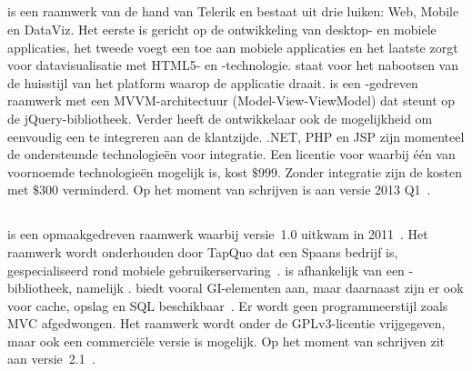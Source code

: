 \subsection{\kendo} %
\kendo{} is een raamwerk van de hand van Telerik en bestaat uit drie luiken:  Web, Mobile en DataViz.
Het eerste is gericht op de ontwikkeling van desktop- en mobiele applicaties,  het tweede voegt een  toe aan mobiele applicaties en het laatste zorgt voor datavisualisatie met HTML5- en \js{}-technologie.
 staat voor het nabootsen van de huisstijl van het platform waarop de applicatie draait.
\kendo{} is een \js{}-gedreven raamwerk met een MVVM-architectuur (Model-View-ViewModel) dat steunt op de jQuery-bibliotheek.
Verder heeft de ontwikkelaar ook de mogelijkheid om eenvoudig een  te integreren aan de klantzijde.
.NET,  PHP en JSP zijn momenteel de ondersteunde technologieën voor  integratie.
Een licentie voor \kendo{} waarbij één van voornoemde technologieën mogelijk is, kost $\$999$.
Zonder  integratie zijn de kosten met $\$300$ verminderd.
Op het moment van schrijven is \kendo{} aan versie 2013 Q1~\cite{Telerik}.

\subsection{\lungo} %
\lungo{} is een opmaakgedreven raamwerk waarbij versie~1.0 uitkwam in 2011~\cite{TapQuo2011}.
Het raamwerk wordt onderhouden door TapQuo dat een Spaans bedrijf is, gespecialiseerd rond mobiele gebruikerservaring~\cite{TapQuo2013a}.
\lungo{} is afhankelijk van een \js{}-bibliotheek, namelijk \quo{}.
\lungo{} biedt vooral GI-elementen aan, maar daarnaast zijn er ook  voor cache, opslag en SQL beschikbaar~\cite{TapQuo2013}.
Er wordt geen programmeerstijl zoals MVC afgedwongen.
Het raamwerk wordt onder de GPLv3-licentie vrijgegeven, maar ook een commerciële versie is mogelijk.
Op het moment van schrijven zit \lungo{} aan versie~2.1~\cite{TapQuo2013}.

